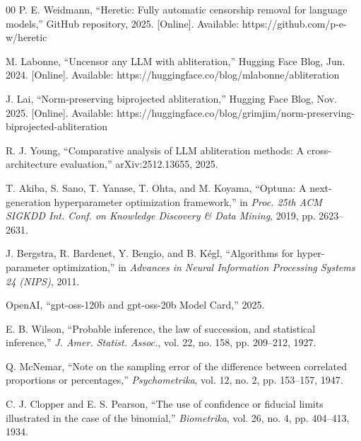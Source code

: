 \documentclass[conference]{IEEEtran}
\begin{document}
\begin{thebibliography}{00}
 P. E. Weidmann, ``Heretic: Fully automatic censorship
removal for language models,'' GitHub repository, 2025. [Online].
Available: https://github.com/p-e-w/heretic

 M. Labonne, ``Uncensor any LLM with abliteration,''
Hugging Face Blog, Jun. 2024. [Online].
Available: https://huggingface.co/blog/mlabonne/abliteration

 J. Lai, ``Norm-preserving biprojected abliteration,''
Hugging Face Blog, Nov. 2025. [Online].
Available: https://huggingface.co/blog/grimjim/norm-preserving-biprojected-abliteration

 R. J. Young, ``Comparative analysis of LLM abliteration
methods: A cross-architecture evaluation,'' arXiv:2512.13655, 2025.

 T. Akiba, S. Sano, T. Yanase, T. Ohta, and M. Koyama,
``Optuna: A next-generation hyperparameter optimization framework,'' in
\textit{Proc. 25th ACM SIGKDD Int. Conf. on Knowledge Discovery \& Data
Mining}, 2019, pp. 2623--2631.

 J. Bergstra, R. Bardenet, Y. Bengio, and B. K\'{e}gl,
``Algorithms for hyper-parameter optimization,'' in \textit{Advances in
Neural Information Processing Systems 24 (NIPS)}, 2011.

 OpenAI, ``gpt-oss-120b and gpt-oss-20b Model Card,'' 2025.

 E. B. Wilson, ``Probable inference, the law of succession, and
statistical inference,'' \textit{J. Amer. Statist. Assoc.}, vol. 22, no. 158,
pp. 209--212, 1927.

 Q. McNemar, ``Note on the sampling error of the difference
between correlated proportions or percentages,'' \textit{Psychometrika}, vol. 12,
no. 2, pp. 153--157, 1947.

 C. J. Clopper and E. S. Pearson, ``The use of confidence or
fiducial limits illustrated in the case of the binomial,'' \textit{Biometrika},
vol. 26, no. 4, pp. 404--413, 1934.

\end{thebibliography}
\end{document}
